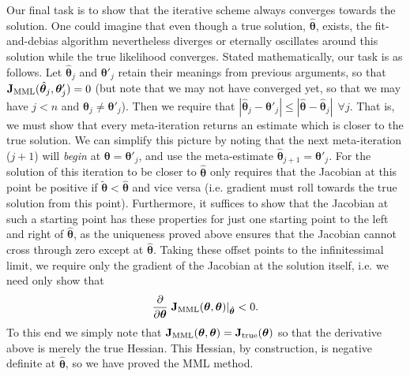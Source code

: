 \documentclass[a4paper,fleqn,usenatbib]{mnras}
\newcommand{\ie}{i.e.\xspace}
\newcommand{\para}{{\bm{\theta}}}
\begin{document}
Our final task is to show that the iterative scheme always converges towards the solution. 
One could imagine that even though a true solution, $\hat{\para}$, exists, the fit-and-debias algorithm nevertheless diverges or eternally oscillates around this solution while the true likelihood converges. Stated mathematically, our task is as follows. 
Let $\hat{\para}_j$ and $\para'_j$ retain their meanings from previous arguments, so that $\mathbf{J}_{\rm MML}(\hat{\para}_j,\para'_j) = 0$ (but note that we may not have converged yet, so that we may have $j < n$ and $\hat{\para}_j \neq \para'_j$). 
Then we require that  $|\hat{\para}_j - \para'_j| \leq |\hat{\para} - \hat{\para}_j| \ \ \forall j$. That is, we must show that every meta-iteration returns an estimate which is closer to the true solution. 
We can simplify this picture by noting that the next meta-iteration ($j+1$) will \textit{begin} at $\para = \para'_j$, and use the meta-estimate $\hat{\para}_{j+1} = \para'_j$. 
For the solution of this iteration to be closer to $\hat{\para}$ only requires that the Jacobian at this point be positive if $\tilde{\para} < \hat{\para}$ and vice versa (i.e. gradient must roll towards the true solution from this point). 
Furthermore, it suffices to show that the Jacobian at such a starting point has these properties for just one starting point to the left and right of $\hat{\para}$, as the uniqueness proved above ensures that the Jacobian cannot cross through zero except at $\hat{\para}$. Taking these offset points to the infinitessimal limit, we require only the gradient of the Jacobian at the solution itself, \ie we need only show that
\begin{equation}
	\frac{\partial}{\partial \para} \left. \mathbf{J}_{\rm MML}(\para,\para) \right|_{\hat{\para}} < 0.
\end{equation}
To this end we simply note that $\mathbf{J}_{\rm MML}(\para,\para) = \mathbf{J}_{\rm true}(\para)$ so that the derivative above is merely the true Hessian. This Hessian, by construction, is negative definite at $\hat{\para}$, so we have proved the MML method.
\end{document}

